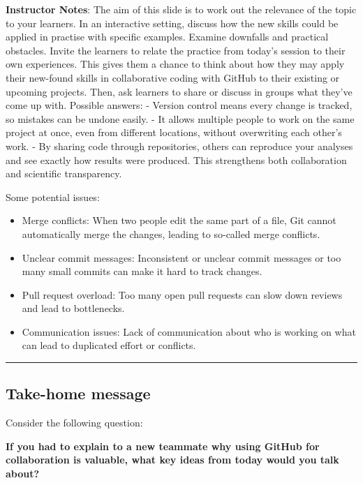 \documentclass[
  letterpaper,
  DIV=11,
  numbers=noendperiod]{scrartcl}
\begin{document}
\textbf{Instructor Notes}: The aim of this slide is to work out the
relevance of the topic to your learners. In an interactive setting,
discuss how the new skills could be applied in practise with specific
examples. Examine downfalls and practical obstacles. Invite the learners
to relate the practice from today's session to their own experiences.
This gives them a chance to think about how they may apply their
new-found skills in collaborative coding with GitHub to their existing
or upcoming projects. Then, ask learners to share or discuss in groups
what they've come up with. Possible answers: - Version control means
every change is tracked, so mistakes can be undone easily. - It allows
multiple people to work on the same project at once, even from different
locations, without overwriting each other's work. - By sharing code
through repositories, others can reproduce your analyses and see exactly
how results were produced. This strengthens both collaboration and
scientific transparency.

Some potential issues:

\begin{itemize}
\item
  Merge conflicts: When two people edit the same part of a file, Git
  cannot automatically merge the changes, leading to so-called merge
  conflicts.
\item
  Unclear commit messages: Inconsistent or unclear commit messages or
  too many small commits can make it hard to track changes.
\item
  Pull request overload: Too many open pull requests can slow down
  reviews and lead to bottlenecks.
\item
  Communication issues: Lack of communication about who is working on
  what can lead to duplicated effort or conflicts.
\end{itemize}

\begin{center}\rule{0.5\linewidth}{0.5pt}\end{center}

\subsection{Take-home message}\label{take-home-message}

Consider the following question:

\textbf{If you had to explain to a new teammate why using GitHub for
collaboration is valuable, what key ideas from today would you talk
about?}
\end{document}
